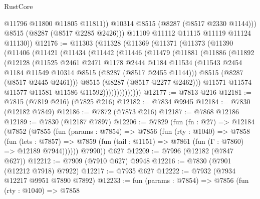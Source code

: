\begin{lexlean}{RustCore}
\begin{coremodule}
                @11796
                @11800
                @11805
                @11811))
            @10314
            @8515
            (@8287 (@8517 @2330 @1144)))
          @8515
          (@8287 (@8517 @2285 @2426)))
        @11109
        @11112
        @11115
        @11119
        @11124
        @11130))
@12176 := @11303
    (@11328
      (@11369
        (@11371
          (@11373
            (@11390
              (@11406
                (@11421
                  (@11434
                    (@11442
                      (@11446
                        (@11479
                          (@11881
                            (@11886
                              (@11892
                                (@12128
                                  (@11525
                                    @2461
                                    @2471
                                    @1178
                                    @2444
                                    @1184
                                    @11534
                                    (@11543
                                      @2454
                                      @1184
                                      @11549
                                      @10314
                                      @8515
                                      (@8287 (@8517 @2455 @1144)))
                                    @8515
                                    (@8287 (@8517 @2445 @2461)))
                                  @8515
                                  (@8287 (@8517 @2277 @2462)))
                                @11571
                                @11574
                                @11577
                                @11581
                                @11586
                                @11592))))))))))))))
@12177 := @7813 @216
@12181 := @7815 (@7819 @216) (@7825 @216)
@12182 := @7834 @9945
@12184 := @7830 (@12182 @7849)
@12186 := @7872 (@7873 @216)
@12187 := @7868 @12186
@12189 := @7830 (@12187 @7897)
@12206 := @7829
    (fun (fn : @27) =>
    @12184
      (@7852
        (@7855
          (fun (params : @7854) =>
          @7856
            (fun (rty : @1040) =>
            @7858
              (fun (lets : @7857) =>
              @7859 (fun (tail : @1151) => @7861 (fun (Γ : @7860) => @12189 @7944))))))
        @7990))
    @627
@12209 := @7996 (@12182 (@7847 @627))
@12212 := @7909 (@7910 @627) @9948
@12216 := @7830 (@7901 (@12212 @7918) @7922)
@12217 := @7935 @627
@12222 := @7932 (@7934 @12217 @9951 @7890 @7892)
@12233 := fun (params : @7854) =>
  @7856
    (fun (rty : @1040) =>
    @7858

\end{coremodule}
\end{lexlean}

